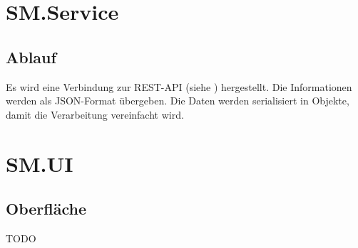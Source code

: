 \documentclass{article}
\begin{document}
\newpage

\section{SM.Service}

\subsection{Ablauf}

Es wird eine Verbindung zur REST-API (siehe \textit{}) hergestellt. Die Informationen werden als JSON-Format übergeben.
Die Daten werden serialisiert in Objekte, damit die Verarbeitung vereinfacht wird.

\newpage

\section{SM.UI}

\subsection{Oberfläche}

TODO
\end{document}
